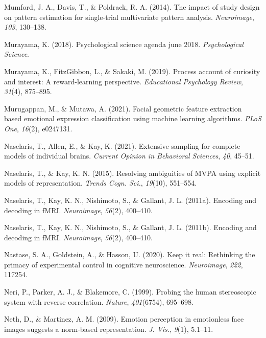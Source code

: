 \documentclass[11pt,american,]{memoir} %
\begin{document}
\leavevmode\hypertarget{ref-mumford2014impact}{}%
Mumford, J. A., Davis, T., \& Poldrack, R. A. (2014). The impact of study design on pattern estimation for single-trial multivariate pattern analysis. \emph{Neuroimage}, \emph{103}, 130--138.

\leavevmode\hypertarget{ref-murayama2018psychological}{}%
Murayama, K. (2018). Psychological science agenda\textbar{} june 2018. \emph{Psychological Science}.

\leavevmode\hypertarget{ref-murayama2019process}{}%
Murayama, K., FitzGibbon, L., \& Sakaki, M. (2019). Process account of curiosity and interest: A reward-learning perspective. \emph{Educational Psychology Review}, \emph{31}(4), 875--895.

\leavevmode\hypertarget{ref-Murugappan2021-yj}{}%
Murugappan, M., \& Mutawa, A. (2021). Facial geometric feature extraction based emotional expression classification using machine learning algorithms. \emph{PLoS One}, \emph{16}(2), e0247131.

\leavevmode\hypertarget{ref-Naselaris2021-ba}{}%
Naselaris, T., Allen, E., \& Kay, K. (2021). Extensive sampling for complete models of individual brains. \emph{Current Opinion in Behavioral Sciences}, \emph{40}, 45--51.

\leavevmode\hypertarget{ref-Naselaris2015-jn}{}%
Naselaris, T., \& Kay, K. N. (2015). Resolving ambiguities of MVPA using explicit models of representation. \emph{Trends Cogn. Sci.}, \emph{19}(10), 551--554.

\leavevmode\hypertarget{ref-naselaris2011encoding}{}%
Naselaris, T., Kay, K. N., Nishimoto, S., \& Gallant, J. L. (2011a). Encoding and decoding in fMRI. \emph{Neuroimage}, \emph{56}(2), 400--410.

\leavevmode\hypertarget{ref-Naselaris2011-oh}{}%
Naselaris, T., Kay, K. N., Nishimoto, S., \& Gallant, J. L. (2011b). Encoding and decoding in fMRI. \emph{Neuroimage}, \emph{56}(2), 400--410.

\leavevmode\hypertarget{ref-Nastase2020-he}{}%
Nastase, S. A., Goldstein, A., \& Hasson, U. (2020). Keep it real: Rethinking the primacy of experimental control in cognitive neuroscience. \emph{Neuroimage}, \emph{222}, 117254.

\leavevmode\hypertarget{ref-Neri1999-rj}{}%
Neri, P., Parker, A. J., \& Blakemore, C. (1999). Probing the human stereoscopic system with reverse correlation. \emph{Nature}, \emph{401}(6754), 695--698.

\leavevmode\hypertarget{ref-Neth2009-eh}{}%
Neth, D., \& Martinez, A. M. (2009). Emotion perception in emotionless face images suggests a norm-based representation. \emph{J. Vis.}, \emph{9}(1), 5.1--11.
\end{document}
